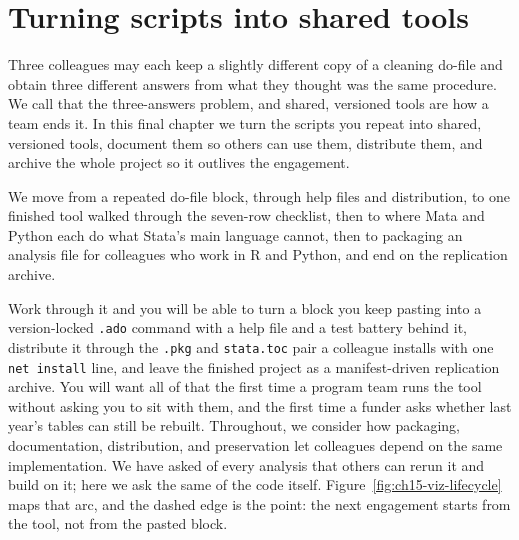 \chapter{Turning scripts into shared tools}\label{ch:tools}

Three colleagues may each keep a slightly different copy of a cleaning do-file and obtain three different answers from what they thought was the same procedure. We call that the three-answers problem, and shared, versioned tools are how a team ends it. In this final chapter we turn the scripts you repeat into shared, versioned tools, document them so others can use them, distribute them, and archive the whole project so it outlives the engagement.

We move from a repeated do-file block, through help files and distribution, to one finished tool walked through the seven-row checklist, then to where Mata and Python each do what Stata's main language cannot, then to packaging an analysis file for colleagues who work in R and Python, and end on the replication archive.

Work through it and you will be able to turn a block you keep pasting into a version-locked \texttt{.ado} command with a help file and a test battery behind it, distribute it through the \texttt{.pkg} and \texttt{stata.toc} pair a colleague installs with one \texttt{net install} line, and leave the finished project as a manifest-driven replication archive. You will want all of that the first time a program team runs the tool without asking you to sit with them, and the first time a funder asks whether last year's tables can still be rebuilt. Throughout, we consider how packaging, documentation, distribution, and preservation let colleagues depend on the same implementation. We have asked of every analysis that others can rerun it and build on it; here we ask the same of the code itself. Figure~\ref{fig:ch15-viz-lifecycle} maps that arc, and the dashed edge is the point: the next engagement starts from the tool, not from the pasted block.

